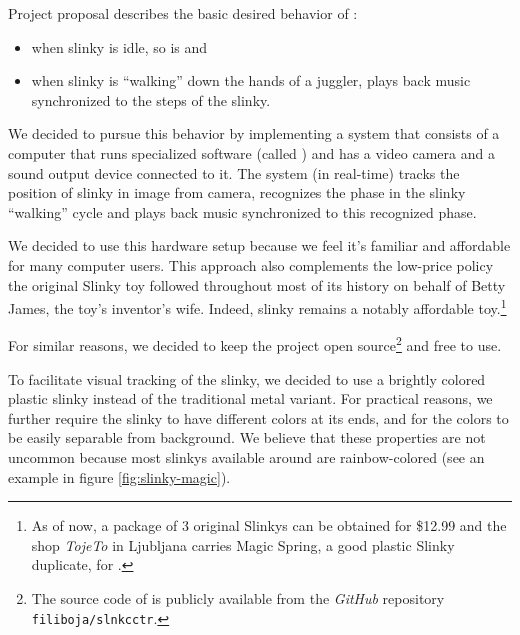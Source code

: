 

\begin{minipage}{\linewidth}
Project proposal\cite{bartek:proposal} describes the basic desired
behavior of \slinkyconductor{}:

\begin{itemize}
\item when slinky is idle, so is \slinkyconductor{} and
\item when slinky is ``walking'' down the hands of a juggler, \slinkyconductor{} plays back music synchronized to the steps of the slinky.
\end{itemize}
\end{minipage}

We decided to pursue this behavior by implementing
a system that consists of
a computer that runs specialized software (called \slnkcctr{}) and has
a video camera and a sound output device connected to it.
The system (in real-time) tracks the position of slinky
in image from camera,
recognizes the phase in the slinky ``walking'' cycle and
plays back music synchronized to this recognized phase.



We decided to use this hardware setup because we feel it's
familiar and affordable for many computer users.
This approach also complements the low-price policy
the original Slinky toy followed throughout most of its history
on behalf of Betty James,
the toy's inventor's wife.\cite[section History]{wiki:slinky}
Indeed, slinky remains a notably affordable toy.\footnote{
As of now,
a package of 3 original Slinkys can be obtained
for \$12.99\cite{poof:slinky}
and the shop \emph{TojeTo} in Ljubljana carries Magic Spring,
a good plastic Slinky duplicate,
for \cite{tojeto:slinky}.
}

For similar reasons, we decided to keep the project
open source\footnote{
The source code of \slnkcctr{} is publicly available
from the \emph{GitHub}
repository \texttt{filiboja/slnkcctr}\cite{filiboja:slnkcctr}.
}
and free to use.

To facilitate visual tracking of the slinky,
we decided to use a brightly colored plastic slinky
instead of the traditional metal variant.
For practical reasons, we further require the slinky to have
different colors at its ends,
and for the colors to be easily separable from background.
We believe that these properties are not uncommon because
most slinkys available around are rainbow-colored
(see an example in figure \ref{fig:slinky-magic}).
